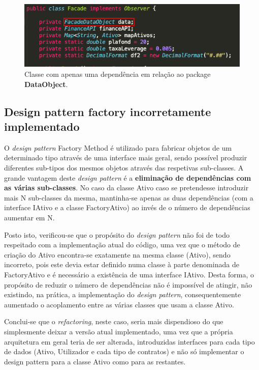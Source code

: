 \begin{figure}[H]
	\centering
	\includegraphics[scale=0.70]{images/change-prevents/change-prevents-2.png}
	\caption{Classe com apenas uma dependência em relação ao package \textbf{DataObject}.}
	\label{img:change-prevents-2}
\end{figure}

\subsection{Design pattern factory incorretamente implementado}

\hspace{5mm} O \emph{design pattern} Factory Method é utilizado para fabricar objetos de um determinado tipo através de uma interface mais geral, sendo possível produzir diferentes sub-tipos dos mesmos objetos através das respetivas sub-classes. A  grande  vantagem  deste  \emph{design  pattern} é a \textbf{eliminação de dependências com  as várias sub-classes}. No caso da classe Ativo caso se pretendesse introduzir mais N sub-classes da mesma, mantinha-se apenas as duas dependências (com a interface IAtivo e a classe FactoryAtivo) ao invés de o número de dependências aumentar em N. 

\hspace{5mm} Posto isto, verificou-se que o propósito do \emph{design pattern} não foi de todo respeitado com a implementação atual do código, uma vez que o método de criação do Ativo encontra-se exatamente na mesma classe (Ativo), sendo incorreto, pois este devia estar definido numa classe à parte denominada de FactoryAtivo e é necessário a existência de uma interface IAtivo. Desta forma, o propósito de reduzir o número de dependências não é impossível de atingir, não existindo, na prática, a implementação do \emph{design pattern}, consequentemente aumentado o acoplamento entre as várias classes que usam a classe Ativo.

\hspace{5mm} Conclui-se que o \emph{refactoring}, neste caso, seria mais dispendioso do que simplesmente deixar a versão atual implementado, uma vez que a própria arquitetura em geral teria de ser alterada, introduzidas interfaces para cada tipo de dados (Ativo, Utilizador e cada tipo de contratos) e não só implementar o design pattern para a classe Ativo como para as restantes.

